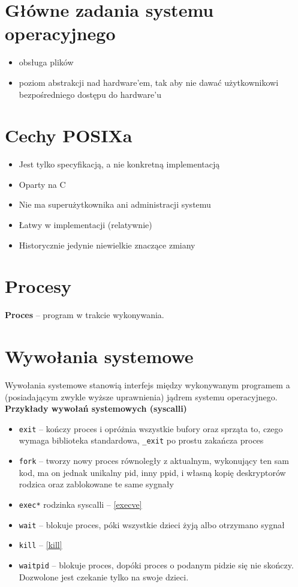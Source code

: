 \section{Główne zadania systemu operacyjnego}
\begin{itemize}
	\item obsługa plików
	\item poziom abstrakcji nad hardware'em, tak aby nie dawać użytkownikowi bezpośredniego dostępu do hardware'u
\end{itemize}
\section{Cechy POSIXa}
\begin{itemize}
	\item Jest tylko specyfikacją, a nie konkretną implementacją
	\item Oparty na C
	\item Nie ma superużytkownika ani administracji systemu
	\item Łatwy w implementacji (relatywnie)
	\item Historycznie jedynie niewielkie znaczące zmiany
\end{itemize}
\section{Procesy}
\textbf{Proces} -- program w trakcie wykonywania.
\section{Wywołania systemowe}
Wywołania systemowe stanowią interfejs między wykonywanym programem a (posiadającym zwykle wyższe uprawnienia) jądrem systemu operacyjnego.\\
\textbf{Przykłady wywołań systemowych (syscalli)}
\begin{itemize}
	\item \texttt{exit} -- kończy proces i opróżnia wszystkie bufory oraz sprząta to, czego wymaga biblioteka standardowa, \texttt{\_exit} po prostu zakańcza proces
	\item \texttt{fork} -- tworzy nowy proces równoległy z aktualnym, wykonujący ten sam kod, ma on jednak unikalny pid, inny ppid, i własną kopię deskryptorów rodzica oraz zablokowane te same sygnały
	\item \texttt{exec*} rodzinka syscalli -- \ref{execve}
	\item \texttt{wait} -- blokuje proces, póki wszystkie dzieci żyją albo otrzymano sygnał
	\item \texttt{kill} -- \ref{kill}
	\item \texttt{waitpid} -- blokuje proces, dopóki proces o podanym pidzie się nie skończy. Dozwolone jest czekanie tylko na swoje dzieci.
\end{itemize}
